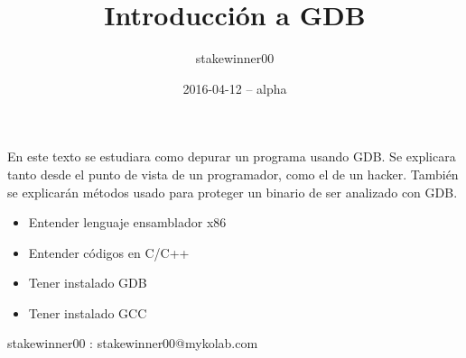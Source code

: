 \documentclass{fennix_plantilla/fennix}
\begin{document}
\title{Introducción a GDB}
\author{stakewinner00}
\date{2016-04-12 -- alpha}
\maketitle
\begin{resumen}
En este texto se estudiara como depurar un programa usando GDB. Se explicara tanto desde el punto de vista de un programador, como el de un hacker. También se explicarán métodos usado para proteger un binario de ser analizado con GDB.
\end{resumen}

\begin{requisitos}
\begin{itemize}
\item Entender lenguaje ensamblador x86
\item Entender códigos en C/C++
\item Tener instalado GDB
\item Tener instalado GCC
\end{itemize}
\end{requisitos}

%
%
%
%

\begin{colabs}
stakewinner00 : stakewinner00@mykolab.com
\end{colabs}
\end{document}
